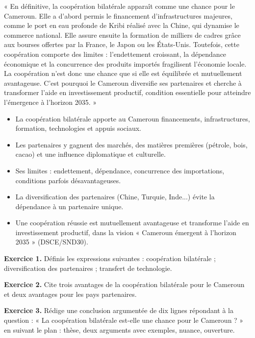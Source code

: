 \documentclass[11pt]{article}
\begin{document}
\begin{exemplebox}
« En définitive, la coopération bilatérale apparaît comme une chance pour le Cameroun. Elle a d'abord permis le financement d'infrastructures majeures, comme le port en eau profonde de Kribi réalisé avec la Chine, qui dynamise le commerce national. Elle assure ensuite la formation de milliers de cadres grâce aux bourses offertes par la France, le Japon ou les États-Unis. Toutefois, cette coopération comporte des limites : l'endettement croissant, la dépendance économique et la concurrence des produits importés fragilisent l'économie locale. La coopération n'est donc une chance que si elle est équilibrée et mutuellement avantageuse. C'est pourquoi le Cameroun diversifie ses partenaires et cherche à transformer l'aide en investissement productif, condition essentielle pour atteindre l'émergence à l'horizon 2035. »
\end{exemplebox}

\begin{aretenir}
\begin{itemize}
\item La coopération bilatérale apporte au Cameroun financements, infrastructures, formation, technologies et appuis sociaux.
\item Les partenaires y gagnent des marchés, des matières premières (pétrole, bois, cacao) et une influence diplomatique et culturelle.
\item Ses limites : endettement, dépendance, concurrence des importations, conditions parfois désavantageuses.
\item La diversification des partenaires (Chine, Turquie, Inde...) évite la dépendance à un partenaire unique.
\item Une coopération réussie est mutuellement avantageuse et transforme l'aide en investissement productif, dans la vision « Cameroun émergent à l'horizon 2035 » (DSCE/SND30).
\end{itemize}
\end{aretenir}

\begin{exercice}
\textbf{Exercice 1.} Définis les expressions suivantes : coopération bilatérale ; diversification des partenaires ; transfert de technologie.

\textbf{Exercice 2.} Cite trois avantages de la coopération bilatérale pour le Cameroun et deux avantages pour les pays partenaires.

\textbf{Exercice 3.} Rédige une conclusion argumentée de dix lignes répondant à la question : « La coopération bilatérale est-elle une chance pour le Cameroun ? » en suivant le plan : thèse, deux arguments avec exemples, nuance, ouverture.
\end{exercice}
\end{document}
